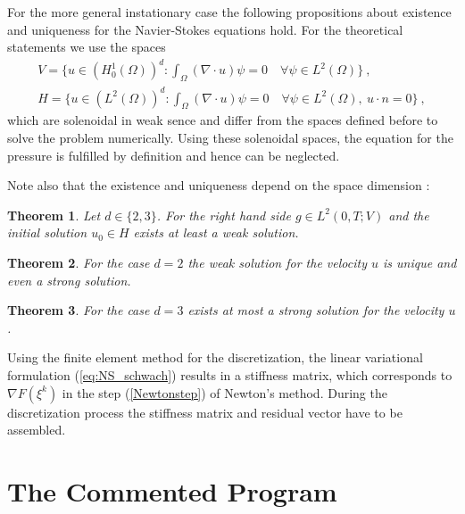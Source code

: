 \documentclass[a4paper, 11pt, twoside]{article}
\newtheorem{theorem}{Theorem}[section]
\begin{document}
For the more general instationary case the following propositions about existence and uniqueness for the Navier-Stokes equations hold. For the theoretical statements we use the spaces 
\begin{align*}
V = \{ u\in (H^1_0(\Omega))^d : \int_{\Omega} (\nabla \cdot u)\psi = 0\quad \forall \psi \in L^2(\Omega)\}\ ,  \\
H = \{ u\in (L^2(\Omega))^d : \int_{\Omega} (\nabla \cdot u)\psi = 0\quad \forall \psi \in L^2(\Omega),\ u\cdot n = 0 \}\ ,
\end{align*}
which are solenoidal in weak sence and differ from the spaces defined before to solve the problem numerically. Using these solenoidal spaces, the equation for the pressure is fulfilled by definition and hence can be neglected.

Note also that the existence and uniqueness depend on the space dimension \cite{sohr,temam}:
\begin{theorem}
Let $d \in \{2,3\}$. For the right hand side $g \in L^2(0,T;V)$ and the initial solution $u_0 \in H$ exists at least a weak solution.
\end{theorem}
\begin{theorem}
For the case $d=2$ the weak solution for the velocity $u$ is unique and even a strong solution.
\end{theorem}
\begin{theorem}
For the case $d=3$ exists at most a strong solution for the velocity $u$. 
\end{theorem}

Using the finite element method for the discretization, the linear variational formulation (\ref{eq:NS_schwach}) 
results in a stiffness matrix, which corresponds to $\nabla F(\xi^k)$ in the step (\ref{Newtonstep}) of Newton's method. 
During the discretization process the stiffness matrix and residual vector have to be assembled. 


\section{The Commented Program}
\end{document}
